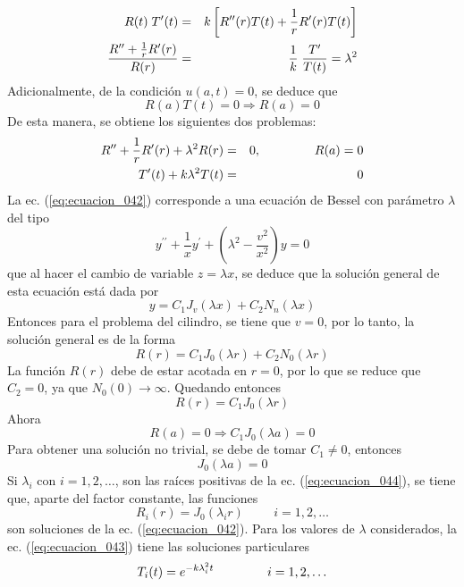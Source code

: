 \begin{eqnarray*}
R(t) \; T'(t) &=& k \left[ R^{\prime \prime}(r) T(t) + \dfrac{1}{r} R^{\prime}(r) T(t) \right] \nonumber \\
\dfrac{R^{\prime \prime} + \frac{1}{r} R^{\prime}(r)}{R(r)} &=& \dfrac{1}{k} \; \dfrac{T^{\prime}}{T(t)} =  \lambda^{2}
\end{eqnarray*}
Adicionalmente, de la condición $u(a,t) = 0$, se deduce que
\[ R(a) T(t) = 0 \Rightarrow R(a) = 0 \]
De esta manera, se obtiene los siguientes dos problemas:
\begin{eqnarray}
R^{\prime \prime} + \dfrac{1}{r} R^{\prime} (r) + \lambda^{2} R(r) &=& 0, \hspace{1.5cm} R(a) = 0 \label{eq:ecuacion_042} \\
T^{\prime}(t) + k \lambda^{2} T(t) &=& 0 \label{eq:ecuacion_043} 
\end{eqnarray}
La ec. (\ref{eq:ecuacion_042}) corresponde a una ecuación de Bessel con parámetro $\lambda$ del tipo
\begin{equation}
y^{\prime \prime} + \dfrac{1}{x} y^{\prime} + \left( \lambda^{2} - \dfrac{v^{2}}{x^{2}} \right) y = 0 
\label{eq:ecuacion_011}
\end{equation}
que al hacer el cambio de variable $z = \lambda x$, se deduce que la solución general de esta ecuación está dada por
\begin{equation}
y = C_{1} J_{v} (\lambda x) + C_{2} N_{n} (\lambda x)
\label{eq:ecuacion_012}
\end{equation}
Entonces para el problema del cilindro, se tiene que $v=0$, por lo tanto, la solución general es de la forma
\[ R(r) = C_{1} J_{0}(\lambda r) + C_{2} N_{0} (\lambda r) \]
La función $R(r)$ debe de estar acotada en $r=0$, por lo que se reduce que $C_{2} =0$, ya que $N_{0}(0) \to \infty$. Quedando entonces
\[ R(r) =C_{1} J_{0} (\lambda r) \]
Ahora
\[ R(a) = 0 \Rightarrow C_{1} J_{0} (\lambda a) = 0 \]
Para obtener una solución no trivial, se debe de tomar $C_{1} \neq 0$, entonces
\begin{equation}
J_{0}(\lambda a) = 0
\label{eq:ecuacion_044}
\end{equation}
Si $\lambda_{i}$ con $i = 1,2, \ldots$, son las raíces positivas de la ec. (\ref{eq:ecuacion_044}), se tiene que, aparte del factor constante, las funciones
\[ R_{i}(r) = J_{0} (\lambda_{i} r) \hspace{1cm} i = 1, 2, \ldots \]
son soluciones de la ec. (\ref{eq:ecuacion_042}).
Para los valores de $\lambda$ considerados, la ec. (\ref{eq:ecuacion_043}) tiene las soluciones particulares
\[ T_{i}(t) = e^{-k \lambda_{i}^{2} t} \hspace{1.5cm} i = 1, 2, \ldots \]
